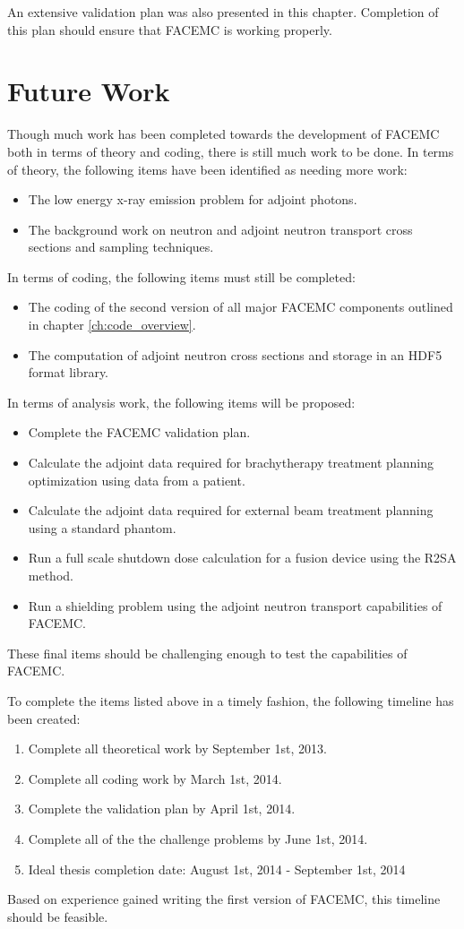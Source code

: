 An extensive validation plan was also presented in this chapter. Completion
of this plan should ensure that FACEMC is working properly.

\section{Future Work}
Though much work has been completed towards the development of FACEMC both in
terms of theory and coding, there is still much work to be done. In terms of
theory, the following items have been identified as needing more work:
\begin{itemize}
  \item The low energy x-ray emission problem for adjoint photons.
  \item The background work on neutron and adjoint neutron transport cross
    sections and sampling techniques.
\end{itemize}
In terms of coding, the following items must still be completed:
\begin{itemize}
  \item The coding of the second version of all major FACEMC components 
    outlined in chapter \ref{ch:code_overview}.
  \item The computation of adjoint neutron cross sections and storage in
    an HDF5 format library.
\end{itemize}
In terms of analysis work, the following items will be proposed:
\begin{itemize}
  \item Complete the FACEMC validation plan.
  \item Calculate the adjoint data required for brachytherapy treatment planning
    optimization using data from a patient.
  \item Calculate the adjoint data required for external beam treatment planning
    using a standard phantom.
  \item Run a full scale shutdown dose calculation for a fusion device using
    the R2SA method.
  \item Run a shielding problem using the adjoint neutron transport capabilities
    of FACEMC.
\end{itemize}
These final items should be challenging enough to test the capabilities of 
FACEMC.

To complete the items listed above in a timely fashion, the following timeline
has been created:
\begin{enumerate}
  \item Complete all theoretical work by September 1st, 2013.
  \item Complete all coding work by March 1st, 2014.
  \item Complete the validation plan by April 1st, 2014.
  \item Complete all of the the challenge problems by June 1st, 2014.
  \item Ideal thesis completion date: August 1st, 2014 - September 1st, 2014
\end{enumerate}
Based on experience gained writing the first version of FACEMC, this timeline
should be feasible. 

